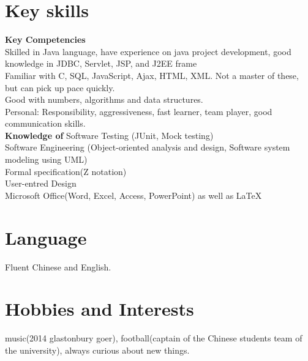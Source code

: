 \documentclass[margin]{res}
\begin{document}
\begin{resume}
\section{Key skills}
 {\bf  Key Competencies}\\
  Skilled in Java language, have experience on java project development, good
  knowledge in JDBC, Servlet, JSP, and J2EE frame\\  
  Familiar with C, SQL, JavaScript, Ajax, HTML, XML. Not a master
  of these, but can pick up pace quickly.\\
  Good with numbers, algorithms and data structures.\\
  Personal: Responsibility, aggressiveness, fast learner, team player, good
  communication skills.\\  
   {\bf Knowledge of}
  Software Testing (JUnit, Mock testing)\\
  Software Engineering (Object-oriented analysis and design,
  Software system modeling using UML)\\
  Formal specification(Z notation)\\
  User-entred Design\\
  Microsoft Office(Word, Excel, Access, PowerPoint)
  as well as \LaTeX \\

\section{Language} Fluent Chinese and English.
\section{Hobbies and Interests}
music(2014 glastonbury goer), football(captain of the Chinese students team of
the university), always curious about new things.
\end{resume} 
\end{document}
